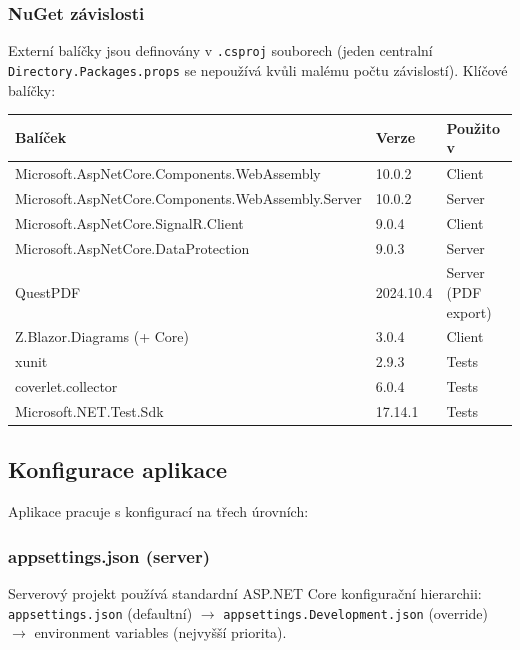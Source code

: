 \documentclass[12pt,a4paper]{article}
\begin{document}
\subsubsection{NuGet závislosti}

Externí balíčky jsou definovány v \texttt{.csproj} souborech
(jeden centralní \texttt{Directory.Packages.props} se nepoužívá kvůli
malému počtu závislostí). Klíčové balíčky:

\begin{longtable}{@{}>{\raggedright\arraybackslash}p{7.6cm}p{1.6cm}p{4.5cm}@{}}
    \toprule
    \textbf{Balíček} & \textbf{Verze} & \textbf{Použito v} \\
    \midrule
    \endhead
    Microsoft.AspNetCore.Components.WebAssembly        & 10.0.2     & Client \\
    Microsoft.AspNetCore.Components.WebAssembly.Server & 10.0.2     & Server \\
    Microsoft.AspNetCore.SignalR.Client                & 9.0.4      & Client \\
    Microsoft.AspNetCore.DataProtection                & 9.0.3      & Server \\
    QuestPDF                                           & 2024.10.4  & Server (PDF export) \\
    Z.Blazor.Diagrams (+ Core)                         & 3.0.4      & Client \\
    xunit                                              & 2.9.3      & Tests \\
    coverlet.collector                                 & 6.0.4      & Tests \\
    Microsoft.NET.Test.Sdk                             & 17.14.1    & Tests \\
    \bottomrule
\end{longtable}

\subsection{Konfigurace aplikace}

Aplikace pracuje s konfigurací na třech úrovních:

\subsubsection{appsettings.json (server)}

Serverový projekt používá standardní ASP.NET Core konfigurační hierarchii:
\texttt{appsettings.json} (defaultní) $\to$ \texttt{appsettings.Development.json}
(override) $\to$ environment variables (nejvyšší priorita).
\end{document}
